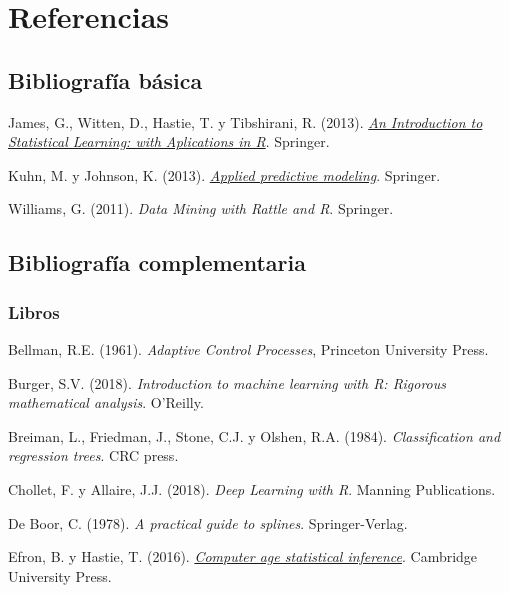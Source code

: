 \documentclass[
]{book}
\theoremstyle{break}
\theoremstyle{definition}
\theoremstyle{definition}
\theoremstyle{definition}
\theoremstyle{definition}
\theoremstyle{remark}
\begin{document}
\hypertarget{referencias}{%
\chapter*{Referencias}\label{referencias}}

\hypertarget{bibliografuxeda-buxe1sica}{%
\section*{Bibliografía básica}\label{bibliografuxeda-buxe1sica}}

James, G., Witten, D., Hastie, T. y Tibshirani, R. (2013). \emph{\href{https://www.statlearning.com}{An Introduction to Statistical Learning: with Aplications in R}}. Springer.

Kuhn, M. y Johnson, K. (2013). \emph{\href{http://appliedpredictivemodeling.com}{Applied predictive modeling}}. Springer.

Williams, G. (2011). \emph{Data Mining with Rattle and R}. Springer.

\hypertarget{bibliografuxeda-complementaria}{%
\section*{Bibliografía complementaria}\label{bibliografuxeda-complementaria}}

\hypertarget{libros}{%
\subsection*{Libros}\label{libros}}

Bellman, R.E. (1961). \emph{Adaptive Control Processes}, Princeton University Press.

Burger, S.V. (2018). \emph{Introduction to machine learning with R: Rigorous mathematical analysis}. O'Reilly.

Breiman, L., Friedman, J., Stone, C.J. y Olshen, R.A. (1984). \emph{Classification and regression trees}. CRC press.

Chollet, F. y Allaire, J.J. (2018). \emph{Deep Learning with R}. Manning Publications.

De Boor, C. (1978). \emph{A practical guide to splines}. Springer-Verlag.

Efron, B. y Hastie, T. (2016). \emph{\href{http://web.stanford.edu/~hastie/CASI/}{Computer age statistical inference}}. Cambridge University Press.
\end{document}
